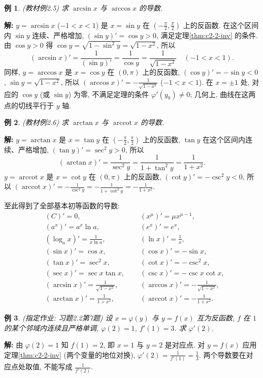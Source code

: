 \documentclass[UTF8,openany]{ctexbook}
\theoremstyle{chinesetextbook}
\newtheorem{example}{例}[section]
\newenvironment{cnsolution}{\par\indent\textbf{解:} \ignorespaces}{\par}
\begin{document}
\begin{example}\label{ex:c2-2-5}
\textnormal{(教材例2.5)} 求 $\arcsin x$ 与 $\arccos x$ 的导数.
\end{example}
\begin{cnsolution}
$y=\arcsin x$ ($-1<x<1$) 是 $x=\sin y$ 在 $\displaystyle\left(-\frac\pi2,\frac\pi2\right)$ 上的反函数. 在这个区间内 $\sin y$ 连续、严格增加, $(\sin y)'=\cos y>0$, 满足定理\ref{thm:c2-2-inv} 的条件. 由 $\cos y>0$ 得 $\cos y=\sqrt{1-\sin^2y}=\sqrt{1-x^2}$, 所以
\[
(\arcsin x)'=\frac1{(\sin y)'}=\frac1{\cos y}=\frac1{\sqrt{1-x^2}}\quad(-1<x<1).
\]
同样, $y=\arccos x$ 是 $x=\cos y$ 在 $(0,\pi)$ 上的反函数, $(\cos y)'=-\sin y<0$, $\sin y=\sqrt{1-x^2}$, 所以 $\displaystyle(\arccos x)'=-\frac1{\sqrt{1-x^2}}$ ($-1<x<1$). 在 $x=\pm1$ 处, 对应的 $\cos y$ (或 $\sin y$) 为零, 不满足定理的条件 $\varphi'(y_0)\ne0$; 几何上, 曲线在这两点的切线平行于 $y$ 轴.
\end{cnsolution}
\begin{example}\label{ex:c2-2-6}
\textnormal{(教材例2.6)} 求 $\arctan x$ 与 $\operatorname{arccot}x$ 的导数.
\end{example}
\begin{cnsolution}
$y=\arctan x$ 是 $x=\tan y$ 在 $\displaystyle\left(-\frac\pi2,\frac\pi2\right)$ 上的反函数, $\tan y$ 在这个区间内连续、严格增加, $(\tan y)'=\sec^2y>0$, 所以
\[
(\arctan x)'=\frac1{\sec^2y}=\frac1{1+\tan^2y}=\frac1{1+x^2}.
\]
$y=\operatorname{arccot}x$ 是 $x=\cot y$ 在 $(0,\pi)$ 上的反函数, $(\cot y)'=-\csc^2y<0$, 所以 $\displaystyle(\operatorname{arccot}x)'=-\frac1{\csc^2y}=-\frac1{1+\cot^2y}=-\frac1{1+x^2}$.
\end{cnsolution}
至此得到了全部基本初等函数的导数:
\[
\begin{aligned}
&(C)'=0, &&(x^\mu)'=\mu x^{\mu-1},\\
&(a^x)'=a^x\ln a, &&(e^x)'=e^x,\\
&(\log_ax)'=\frac1{x\ln a}, &&(\ln x)'=\frac1x,\\
&(\sin x)'=\cos x, &&(\cos x)'=-\sin x,\\
&(\tan x)'=\sec^2x, &&(\cot x)'=-\csc^2x,\\
&(\sec x)'=\sec x\tan x, &&(\csc x)'=-\csc x\cot x,\\
&(\arcsin x)'=\frac1{\sqrt{1-x^2}}, &&(\arccos x)'=-\frac1{\sqrt{1-x^2}},\\
&(\arctan x)'=\frac1{1+x^2},\qquad &&(\operatorname{arccot}x)'=-\frac1{1+x^2}.
\end{aligned}
\]
\begin{example}\label{ex:c2-h2-7}
\textnormal{(指定作业: 习题2.2第7题)} 设 $x=\varphi(y)$ 与 $y=f(x)$ 互为反函数, $f$ 在 $1$ 的某个邻域内连续且严格单调, $\varphi(2)=1$, $f'(1)=3$. 求 $\varphi'(2)$.
\end{example}
\begin{cnsolution}
由 $\varphi(2)=1$ 知 $f(1)=2$, 即 $x=1$ 与 $y=2$ 是对应点. 对 $y=f(x)$ 应用定理\ref{thm:c2-2-inv} (两个变量的地位对换), $\displaystyle\varphi'(2)=\frac1{f'(1)}=\frac13$. 两个导数要在对应点处取值, 不能写成 $\displaystyle\frac1{f'(2)}$.
\end{cnsolution}
\end{document}
